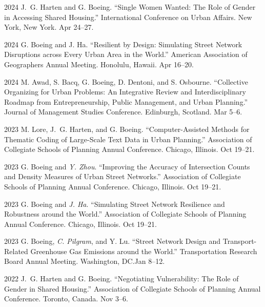 \documentclass[11pt,letterpaper]{report}
\begin{document}
    \begin{tablist}

        \item[2024] \tab{}J.~G. Harten and G. Boeing. \enquote{Single Women Wanted: The Role of Gender in Accessing Shared Housing.} International Conference on Urban Affairs. New York, New York. Apr 24--27.

        \item[2024] \tab{}G. Boeing and J. Ha. \enquote{Resilient by Design: Simulating Street Network Disruptions across Every Urban Area in the World.} American Association of Geographers Annual Meeting. Honolulu, Hawaii. Apr 16--20.

        \item[2024] \tab{}M. Awad, S. Bacq, G. Boeing, D. Dentoni, and S. Osbourne. \enquote{Collective Organizing for Urban Problems: An Integrative Review and Interdisciplinary Roadmap from Entrepreneurship, Public Management, and Urban Planning.} Journal of Management Studies Conference. Edinburgh, Scotland. Mar 5--6.

        \item[2023] \tab{}M. Lore, J.~G. Harten, and G. Boeing. \enquote{Computer-Assisted Methods for Thematic Coding of Large-Scale Text Data in Urban Planning.} Association of Collegiate Schools of Planning Annual Conference. Chicago, Illinois. Oct 19--21.

        \item[2023] \tab{}G. Boeing and \textit{Y. Zhou}. \enquote{Improving the Accuracy of Intersection Counts and Density Measures of Urban Street Networks.} Association of Collegiate Schools of Planning Annual Conference. Chicago, Illinois. Oct 19--21.

        \item[2023] \tab{}G. Boeing and \textit{J. Ha}. \enquote{Simulating Street Network Resilience and Robustness around the World.} Association of Collegiate Schools of Planning Annual Conference. Chicago, Illinois. Oct 19--21.

        \item[2023] \tab{}G. Boeing, \textit{C. Pilgram}, and Y. Lu. \enquote{Street Network Design and Transport-Related Greenhouse Gas Emissions around the World.} Transportation Research Board Annual Meeting. Washington, DC.\@ Jan 8--12.

        \item[2022] \tab{}J.~G. Harten and G. Boeing. \enquote{Negotiating Vulnerability: The Role of Gender in Shared Housing.} Association of Collegiate Schools of Planning Annual Conference. Toronto, Canada. Nov 3--6.


\end{tablist}
\end{document}

